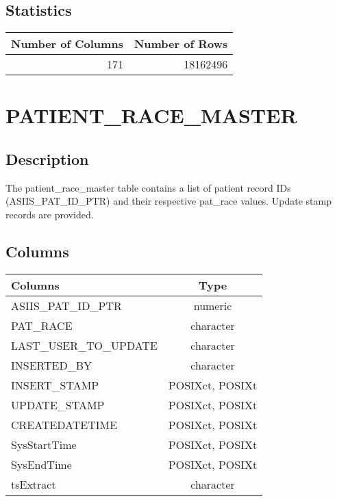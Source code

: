 \documentclass[
  letterpaper,
  DIV=11,
  numbers=noendperiod]{scrreprt}
\begin{document}
\hypertarget{statistics-27}{%
\section*{Statistics}\label{statistics-27}}

\begin{longtable}{rr}
\toprule
Number of Columns & Number of Rows \\ 
\midrule
171 & 18162496 \\ 
\bottomrule
\end{longtable}

\hypertarget{patient_race_master}{%
\chapter*{PATIENT\_RACE\_MASTER}\label{patient_race_master}}

\hypertarget{description-28}{%
\section*{Description}\label{description-28}}

The patient\_race\_master table contains a list of patient record IDs
(ASIIS\_PAT\_ID\_PTR) and their respective pat\_race values. Update
stamp records are provided.

\hypertarget{columns-28}{%
\section*{Columns}\label{columns-28}}

\begin{longtable}{lc}
\toprule
Columns & Type \\ 
\midrule
ASIIS\_PAT\_ID\_PTR & numeric \\ 
PAT\_RACE & character \\ 
LAST\_USER\_TO\_UPDATE & character \\ 
INSERTED\_BY & character \\ 
INSERT\_STAMP & POSIXct, POSIXt \\ 
UPDATE\_STAMP & POSIXct, POSIXt \\ 
CREATEDATETIME & POSIXct, POSIXt \\ 
SysStartTime & POSIXct, POSIXt \\ 
SysEndTime & POSIXct, POSIXt \\ 
tsExtract & character \\ 
\bottomrule
\end{longtable}
\end{document}
